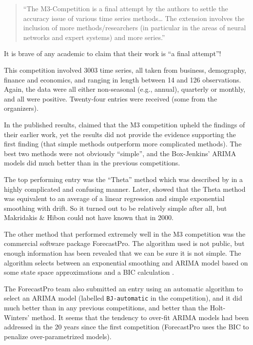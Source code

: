 \documentclass[11pt,a4paper,]{article}
\begin{document}
\begin{quote}
``The M3-Competition is a final attempt by the authors to settle the accuracy issue of various time series methods\ldots{} The extension involves the inclusion of more methods/researchers (in particular in the areas of neural networks and expert systems) and more series.''
\end{quote}

It is brave of any academic to claim that their work is ``a final attempt''!

This competition involved 3003 time series, all taken from business, demography, finance and economics, and ranging in length between 14 and 126 observations. Again, the data were all either non-seasonal (e.g., annual), quarterly or monthly, and all were positive. Twenty-four entries were received (some from the organizers).

In the published results, \textcite{M3} claimed that the M3 competition upheld the findings of their earlier work, yet the results did not provide the evidence supporting the first finding (that simple methods outperform more complicated methods). The best two methods were not obviously ``simple'', and the Box-Jenkins' ARIMA models did much better than in the previous competitions.

The top performing entry was the ``Theta'' method which was described by \textcite{theta00} in a highly complicated and confusing manner. Later, \textcite{HB03} showed that the Theta method was equivalent to an average of a linear regression and simple exponential smoothing with drift. So it turned out to be relatively simple after all, but Makridakis \& Hibon could not have known that in 2000.

The other method that performed extremely well in the M3 competition was the commercial software package ForecastPro. The algorithm used is not public, but enough information has been revealed that we can be sure it is not simple. The algorithm selects between an exponential smoothing and ARIMA model based on some state space approximations and a BIC calculation \autocite{Goodrich2000}.

The ForecastPro team also submitted an entry using an automatic algorithm to select an ARIMA model (labelled \texttt{BJ-automatic} in the competition), and it did much better than in any previous competitions, and better than the Holt-Winters' method. It seems that the tendency to over-fit ARIMA models had been addressed in the 20 years since the first competition (ForecastPro uses the BIC to penalize over-parametrized models).
\end{document}
